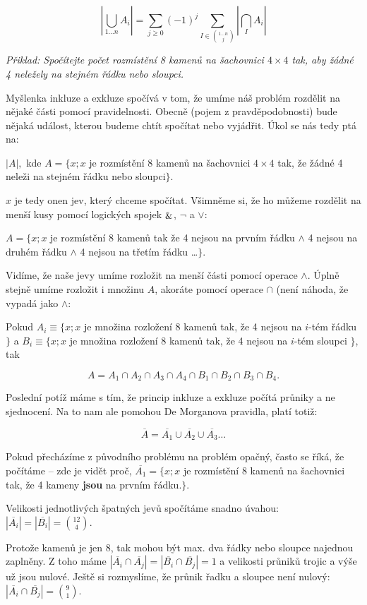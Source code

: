 $$|\bigcup_{1\dots n} A_i| = \sum_{j\ge 0} (-1)^j \sum_{I \in {1\dots n \choose j}} |\bigcap_I A_i|$$


{\it Přiklad: Spočítejte počet rozmístění 8 kamenů na šachovnici $4 × 4$ tak, aby žádné 4 neležely na stejném řádku nebo sloupci.}

Myšlenka inkluze a exkluze spočívá v tom, že umíme náš problém
rozdělit na nějaké části pomocí pravidelnosti. Obecně 
(pojem z pravděpodobnosti) bude nějaká událost, kterou budeme chtít
spočítat nebo vyjádřit. Úkol se nás tedy ptá na:

$|A|,$ kde $A = \{x ; x$ je rozmístění 8 kamenů na šachovnici $4 × 4$
tak, že žádné 4 neleži na stejném řádku nebo sloupci$\}$.

$x$ je tedy onen jev, který chceme spočítat. Všimněme si, že ho můžeme
rozdělit na menší kusy pomocí logických spojek $\mathop\&$, $¬$ a $∨$:

$A = \{x ; x$ je rozmístění 8 kamenů tak že 4 nejsou na prvním řádku
$∧$ 4 nejsou na druhém řádku $∧$ 4 nejsou na třetím řádku \dots $\}$.

Vidíme, že naše jevy umíme rozložit na menší části pomocí operace
$∧$. Úplně stejně umíme rozložit i množinu $A$, akoráte pomocí operace
$∩$ (není náhoda, že vypadá jako $∧$:

Pokud $A_i ≡ \{x ; x $ je množina rozložení 8 kamenů tak, že 4 nejsou
na $i$-tém řádku $\}$ a $B_i ≡ \{x; x $ je množina rozložení 8 kamenů
tak, že 4 nejsou na $i$-tém sloupci $\}$, tak

$$A = A_1 ∩ A_2 ∩ A_3 ∩ A_4 ∩ B_1 ∩ B_2 ∩ B_3 ∩ B_4.$$

Poslední potíž máme s tím, že princip inkluze a exkluze počítá průniky
a ne sjednocení. Na to nam ale pomohou De Morganova pravidla, platí totiž:

$$\overline{A} = \overline{A_1} ∪ \overline{A_2} ∪ \overline{A_3} \dots $$

Pokud přecházíme z původního problému na problém opačný, často se
říká, že počítáme  -- zde je vidět proč,
$\overline{A_1} = \{x; x$ je rozmístění 8 kamenů na šachovnici tak, že
4 kameny {\bf jsou} na prvním řádku.$\}$.

Velikosti jednotlivých špatných jevů spočítáme snadno úvahou:
$|\overline{A_i}| = |\overline{B_i}| = {12 \choose 4}$.

Protože kamenů je jen $8$, tak mohou být max. dva řádky nebo sloupce
najednou zaplněny. Z toho máme $|\overline{A_i} ∩ \overline{A_j}| =
|\overline{B_i} ∩ \overline{B_j}| = 1$ a velikosti průniků trojic a
výše už jsou nulové.  Ještě si rozmyslíme, že průnik řadku a sloupce
není nulový: $|\overline{A_i} ∩ \overline{B_j}| = {9 \choose 1}$.

